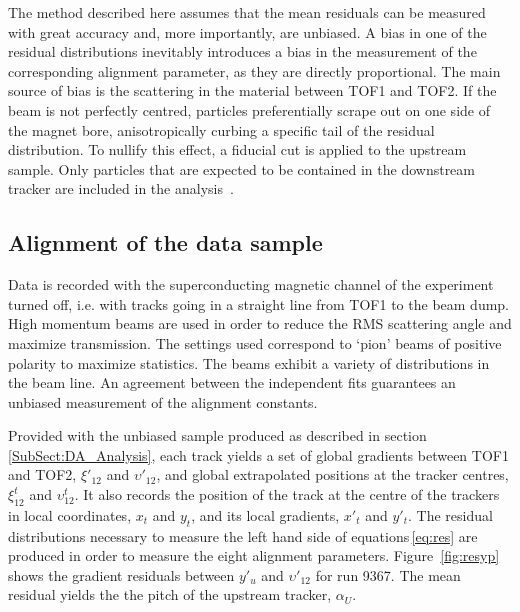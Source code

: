 The method described here assumes that the mean residuals can be measured with great accuracy and, more importantly, are unbiased. A bias in one of the residual distributions inevitably introduces a bias in the measurement of the corresponding alignment parameter, as they are directly proportional. The main source of bias is the scattering in the material between TOF1 and TOF2. If the beam is not perfectly centred, particles preferentially scrape out on one side of the magnet bore, anisotropically curbing a specific tail of the residual distribution. To nullify this effect, a fiducial cut is applied to the upstream sample. Only particles that are expected to be contained in the downstream tracker are included in the analysis~\cite{2018arXiv1805.06623T}.


\subsection{Alignment of the data sample}
\label{SubSect:DA_Data}
Data is recorded with the superconducting magnetic channel of the experiment turned off, i.e. with tracks going in a straight line from TOF1 to the beam dump. High momentum beams are used in order to reduce the RMS scattering angle and maximize transmission. The settings used correspond to `pion' beams of positive polarity to maximize statistics. The beams exhibit a variety of distributions in the beam line.  An agreement between the independent fits guarantees an unbiased measurement of the alignment constants.

Provided with the unbiased sample produced as described in section\,\ref{SubSect:DA_Analysis}, each track yields a set of global gradients between TOF1 and TOF2, $\xi'_{12}$ and $\upsilon'_{12}$, and global extrapolated positions at the tracker centres, $\xi_{12}^t$ and $\upsilon_{12}^t$. It also records the position of the track at the centre of the trackers in local coordinates, $x_t$ and $y_t$, and its local gradients, $x'_t$ and $y'_t$. The residual distributions necessary to measure the left hand side of equations\,\ref{eq:res} are produced in order to measure the eight alignment parameters. Figure~\ref{fig:resyp} shows the gradient residuals between $y'_u$ and $\upsilon'_{12}$ for run 9367. The mean residual yields the the pitch of the upstream tracker, $\alpha_U$.

